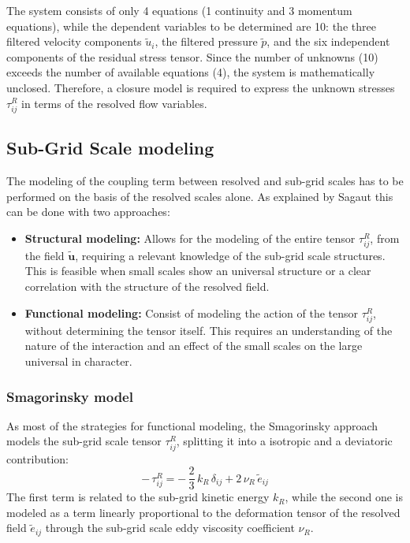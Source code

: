 \documentclass[12pt, a4paper, twoside, openright]{book}
\begin{document}
The system consists of only 4 equations (1 continuity and 3 momentum equations), while the dependent variables to be determined are 10: the three filtered velocity components $\widetilde{u}_i$, the filtered pressure $\widetilde{p}$, and the six independent components of the residual stress tensor. Since the number of unknowns (10) exceeds the number of available equations (4), the system is mathematically unclosed. Therefore, a closure model is required to express the unknown stresses $\tau_{ij}^R$ in terms of the resolved flow variables.

\subsection{Sub-Grid Scale modeling}
The modeling of the coupling term between resolved and sub-grid scales has to be performed on the basis of the resolved scales alone. As explained by Sagaut \cite{les-sagaut} this can be done with two approaches:
\begin{itemize}
	\item \textbf{Structural modeling:} Allows for the modeling of the entire tensor $\tau_{ij}^R$, from the field $\widetilde{\bm{u}}$, requiring a relevant knowledge of the sub-grid scale structures. This is feasible when small scales show an universal structure or a clear correlation with the structure of the resolved field.
	\item \textbf{Functional modeling:} Consist of modeling the action of the tensor $\tau_{ij}^R$, without determining the tensor itself. This requires an understanding of the nature of the interaction and an effect of the small scales on the large universal in character.
\end{itemize}

\subsubsection{Smagorinsky model}
As most of the strategies for functional modeling, the Smagorinsky approach models the sub-grid scale tensor $\tau_{ij}^R$, splitting it into a isotropic and a deviatoric contribution:
\begin{equation}
	- \, \tau_{ij}^R = - \, \frac{2}{3} \, k_R \, \delta_{ij} + 2 \, \nu_R \, \widetilde{e}_{ij}
\end{equation}
The first term is related to the sub-grid kinetic energy $k_R$, while the second one is modeled as a term linearly proportional to the deformation tensor of the resolved field $\widetilde{e}_{ij}$ through the sub-grid scale eddy viscosity coefficient $\nu_R$.
\end{document}
